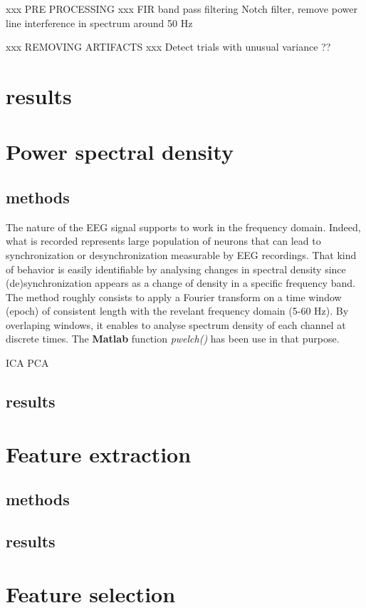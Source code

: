 \documentclass{article} %
\begin{document}
xxx PRE PROCESSING xxx
FIR band pass filtering
Notch filter, remove power line interference in spectrum around 50 Hz

xxx REMOVING ARTIFACTS xxx
Detect trials with unusual variance ??

\section{results}

\section{Power spectral density}

\subsection{methods}
The nature of the EEG signal supports to work in the frequency domain. Indeed, what is recorded represents large population of neurons that can lead to synchronization or desynchronization measurable by EEG recordings. That kind of behavior is easily identifiable by analysing changes in spectral density since (de)synchronization appears as a change of density in a specific frequency band. The method roughly consists to apply a Fourier transform on a time window (epoch) of consistent length with the revelant frequency domain (5-60 Hz). By overlaping windows, it enables to analyse spectrum density of each channel at discrete times. The \textbf{Matlab} function \textit{pwelch()} has been use in that purpose.

ICA
PCA

\subsection{results}

\section{Feature extraction}

\subsection{methods}
\subsection{results}

\section{Feature selection}
\end{document}
